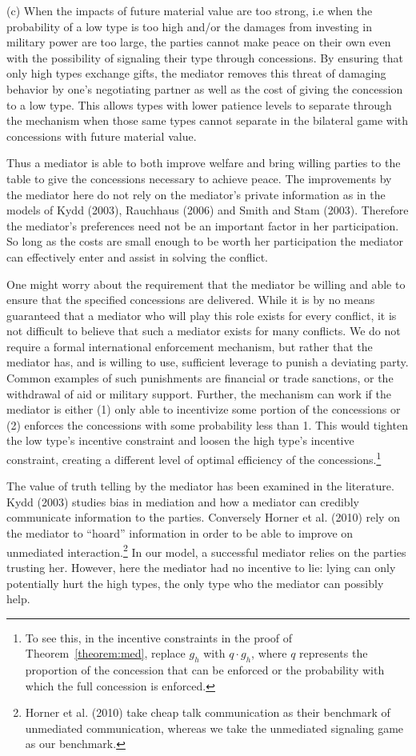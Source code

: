 \documentclass[12pt, letterpaper]{article}
\begin{document}
(c) When the impacts of future material value are too strong, i.e when the probability of a low type is too high and/or the damages from investing in military power are too large, the parties cannot make peace on their own even with the possibility of signaling their type through concessions. By ensuring that only high types exchange gifts, the mediator removes this threat of damaging behavior by one's negotiating partner as well as the cost of giving the concession to a low type. This allows types with lower patience levels to separate through the mechanism when those same types cannot separate in the bilateral game with concessions with future material value.

Thus a mediator is able to both improve welfare and bring willing parties to the table to give the concessions necessary to achieve peace. The improvements by the mediator here do not rely on the mediator's private information as in the models of Kydd (2003), Rauchhaus (2006) and Smith and Stam (2003). Therefore the mediator's preferences need not be an important factor in her participation. So long as the costs are small enough to be worth her participation the mediator can effectively enter and assist in solving the conflict.

One might worry about the requirement that the mediator be willing and able to ensure that the specified concessions are delivered. While it is by no means guaranteed that a mediator who will play this role exists for every conflict, it is not difficult to believe that such a mediator exists for many conflicts. We do not require a formal international enforcement mechanism, but rather that the mediator has, and is willing to use, sufficient leverage to punish a deviating party. Common examples of such punishments are financial or trade sanctions, or the withdrawal of aid or military support. Further, the mechanism can work if the mediator is either (1) only able to incentivize some portion of the concessions or (2) enforces the concessions with some probability less than 1. This would tighten the low type's incentive constraint and loosen the high type's incentive constraint, creating a different level of optimal efficiency of the concessions.\footnote{To see this, in the incentive constraints in the proof of Theorem~\ref{theorem:med}, replace $g_h$ with $q \cdot g_h$, where $q$ represents the proportion of the concession that can be enforced or the probability with which the full concession is enforced.} 

The value of truth telling by the mediator has been examined in the literature. Kydd (2003) studies bias in mediation and how a mediator can credibly communicate information to the parties. Conversely Horner et al. (2010) rely on the mediator to ``hoard'' information in order to be able to improve on unmediated interaction.\footnote{Horner et al. (2010) take cheap talk communication as their benchmark of unmediated communication, whereas we take the unmediated signaling game as our benchmark.} In our model, a successful mediator relies on the parties trusting her. However, here the mediator had no incentive to lie: lying can only potentially hurt the high types, the only type who the mediator can possibly help.
\end{document}
